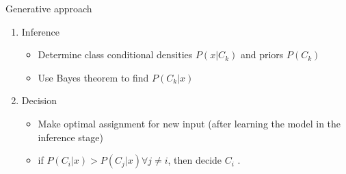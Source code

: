 \documentclass[serif, aspectratio=169]{beamer}
\begin{document}
\begin{frame}{Generative approach}
    \begin{enumerate}
        \item Inference
        \begin{itemize}
            \item Determine class conditional densities $P(x|C_k)$ and priors $P(C_k)$
            \item Use Bayes theorem to find $P(C_k|x)$
        \end{itemize}
        \item Decision
        \begin{itemize}
            \item Make optimal assignment for new input (after learning the model in the inference stage)
            \item if $P(C_i|x) > P(C_j|x) \forall j \neq i$, then decide $C_i$ .
        \end{itemize}
    \end{enumerate}
\end{frame}
\end{document}
